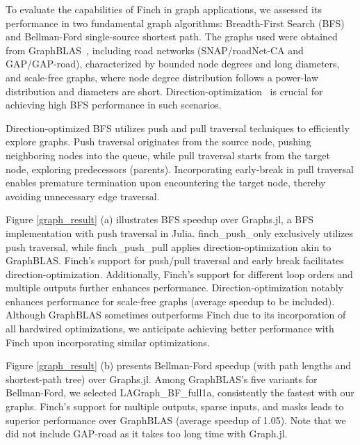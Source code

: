 To evaluate the capabilities of Finch in graph applications, we assessed its performance in two fundamental graph algorithms: Breadth-First Search (BFS) and Bellman-Ford single-source shortest path. The graphs used were obtained from GraphBLAS~\cite{mattson2019lagraph}, including road networks (SNAP/roadNet-CA and GAP/GAP-road), characterized by bounded node degrees and long diameters, and scale-free graphs, where node degree distribution follows a power-law distribution and diameters are short. Direction-optimization~\cite{beamer2012direction} is crucial for achieving high BFS performance in such scenarios.

Direction-optimized BFS utilizes push and pull traversal techniques to efficiently explore graphs. Push traversal originates from the source node, pushing neighboring nodes into the queue, while pull traversal starts from the target node, exploring predecessors (parents). Incorporating early-break in pull traversal enables premature termination upon encountering the target node, thereby avoiding unnecessary edge traversal.

Figure \ref{graph_result} (a) illustrates BFS speedup over Graphs.jl, a BFS implementation with push traversal in Julia. finch\_push\_only exclusively utilizes push traversal, while finch\_push\_pull applies direction-optimization akin to GraphBLAS. Finch's support for push/pull traversal and early break facilitates direction-optimization. Additionally, Finch's support for different loop orders and multiple outputs further enhances performance. Direction-optimization notably enhances performance for scale-free graphs (average speedup to be included). Although GraphBLAS sometimes outperforms Finch due to its incorporation of all hardwired optimizations, we anticipate achieving better performance with Finch upon incorporating similar optimizations.  

Figure \ref{graph_result} (b) presents Bellman-Ford speedup (with path lengths and shortest-path tree) over Graphs.jl. Among GraphBLAS's five variants for Bellman-Ford, we selected LAGraph\_BF\_full1a, consistently the fastest with our graphs. Finch's support for multiple outputs, sparse inputs, and masks leads to superior performance over GraphBLAS (average speedup of 1.05). Note that we did not include GAP-road as it takes too long time with Graph.jl. 
 
